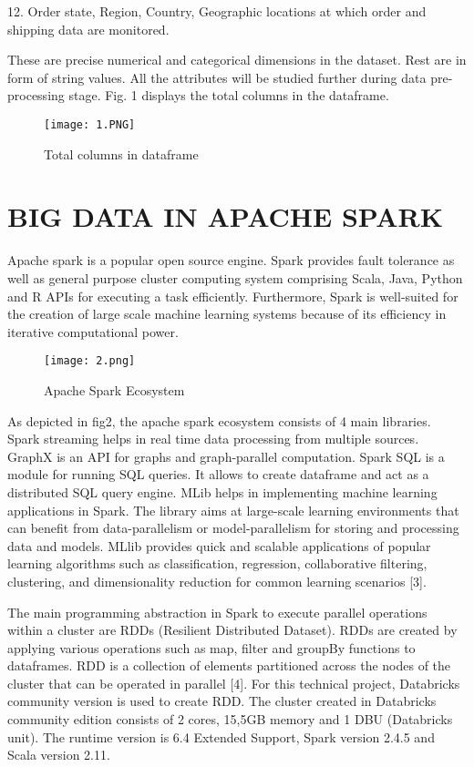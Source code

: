 \documentclass[journal,twoside,web]{ieeecolor}
\begin{document}
12.	Order state, Region, Country, Geographic locations at which order and shipping data are monitored.


These are precise numerical and categorical dimensions in the dataset. Rest are in form of string values. All the attributes will be studied further during data pre-processing stage. Fig. 1 displays the total columns in the dataframe. 



\begin{figure}[htbp]
\centerline{\texttt{[image: 1.PNG]}}
\caption{Total columns in dataframe}
\label{fig1 }
\end{figure}


\section{BIG DATA IN APACHE SPARK}
Apache spark is a popular open source engine. Spark provides fault tolerance as well as general purpose cluster computing system comprising Scala, Java, Python and R APIs for executing a task efficiently. Furthermore, Spark is well-suited for the creation of large scale machine learning systems because of its efficiency in iterative computational power.

\begin{figure}[htbp]
\centerline{\texttt{[image: 2.png]}}
\caption{Apache Spark Ecosystem}
\label{fig2 }
\end{figure}


As depicted in fig2, the apache spark ecosystem consists of 4 main libraries. Spark streaming helps in real time data processing from multiple sources. GraphX is an API for graphs and graph-parallel computation. Spark SQL is a module for running SQL queries. It allows to create dataframe and act as a distributed SQL query engine. MLib helps in implementing machine learning applications in Spark. The library aims at large-scale learning environments that can benefit from data-parallelism or model-parallelism for storing and processing data and models. MLlib provides quick and scalable applications of popular learning algorithms such as classification, regression, collaborative filtering, clustering, and dimensionality reduction for common learning scenarios [3].


The main programming abstraction in Spark to execute parallel operations within a cluster are RDDs (Resilient Distributed Dataset). RDDs are created by applying various operations such as map, filter and groupBy functions to dataframes. RDD is a collection of elements partitioned across the nodes of the cluster that can be operated in parallel [4]. For this technical project, Databricks community version is used to create RDD. The cluster created in Databricks community edition consists of 2 cores, 15,5GB memory and 1 DBU (Databricks unit). The runtime version is 6.4 Extended Support, Spark version 2.4.5 and Scala version 2.11.
\end{document}
